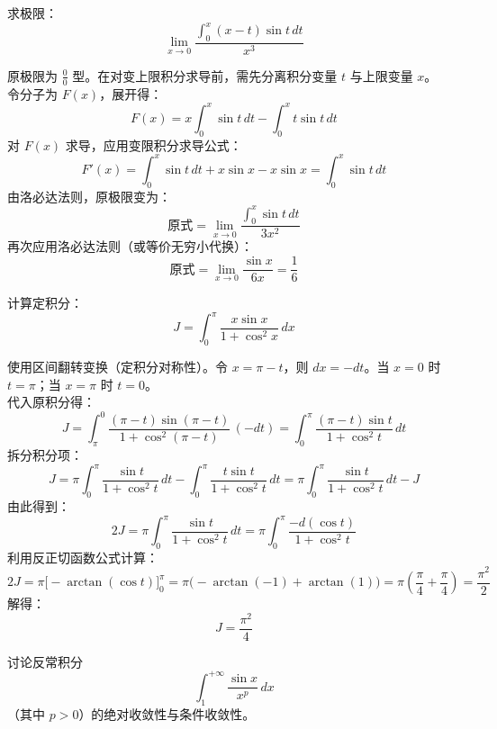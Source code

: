 \documentclass[lang=cn,12pt]{elegantbook}
\begin{document}
\vspace{1em}

\begin{example}
求极限：
\[ \lim_{x \to 0} \frac{\int_0^x (x-t)\sin t \, dt}{x^3} \]
\end{example}

\begin{solution}
    原极限为 $\frac{0}{0}$ 型。在对变上限积分求导前，需先分离积分变量 $t$ 与上限变量 $x$。 \\
    令分子为 $F(x)$，展开得：
    \[ F(x) = x \int_0^x \sin t \, dt - \int_0^x t \sin t \, dt \]
    对 $F(x)$ 求导，应用变限积分求导公式：
    \[ F'(x) = \int_0^x \sin t \, dt + x \sin x - x \sin x = \int_0^x \sin t \, dt \]
    由洛必达法则，原极限变为：
    \[ \text{原式} = \lim_{x \to 0} \frac{\int_0^x \sin t \, dt}{3x^2} \]
    再次应用洛必达法则（或等价无穷小代换）：
    \[ \text{原式} = \lim_{x \to 0} \frac{\sin x}{6x} = \frac{1}{6} \]
\end{solution}

\vspace{1em}

\begin{example}
计算定积分：
\[ J = \int_0^\pi \frac{x \sin x}{1+\cos^2 x} \, dx \]
\end{example}

\begin{solution}
    使用区间翻转变换（定积分对称性）。令 $x = \pi - t$，则 $dx = -dt$。当 $x=0$ 时 $t=\pi$；当 $x=\pi$ 时 $t=0$。 \\
    代入原积分得：
    \[ J = \int_{\pi}^0 \frac{(\pi - t) \sin(\pi - t)}{1+\cos^2(\pi - t)} \, (-dt) = \int_0^\pi \frac{(\pi - t) \sin t}{1+\cos^2 t} \, dt \]
    拆分积分项：
    \[ J = \pi \int_0^\pi \frac{\sin t}{1+\cos^2 t} \, dt - \int_0^\pi \frac{t \sin t}{1+\cos^2 t} \, dt = \pi \int_0^\pi \frac{\sin t}{1+\cos^2 t} \, dt - J \]
    由此得到：
    \[ 2J = \pi \int_0^\pi \frac{\sin t}{1+\cos^2 t} \, dt = \pi \int_0^\pi \frac{-d(\cos t)}{1+\cos^2 t} \]
    利用反正切函数公式计算：
    \[ 2J = \pi \Big[ -\arctan(\cos t) \Big]_0^\pi = \pi \big( -\arctan(-1) + \arctan(1) \big) = \pi \left( \frac{\pi}{4} + \frac{\pi}{4} \right) = \frac{\pi^2}{2} \]
    解得：
    \[ J = \frac{\pi^2}{4} \]
\end{solution}

\vspace{1em}

\begin{example}
讨论反常积分 $$\int_1^{+\infty} \frac{\sin x}{x^p} \, dx$$ （其中 $p > 0$）的绝对收敛性与条件收敛性。
\end{example}
\end{document}
